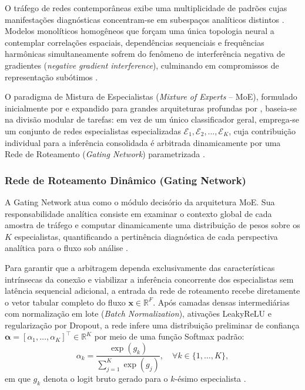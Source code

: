 O tráfego de redes contemporâneas exibe uma multiplicidade de padrões cujas manifestações diagnósticas concentram-se em subespaços analíticos distintos \cite{alfmoe2026, trafficmoe2026}. Modelos monolíticos homogêneos que forçam uma única topologia neural a contemplar correlações espaciais, dependências sequenciais e frequências harmônicas simultaneamente sofrem do fenômeno de interferência negativa de gradientes (\emph{negative gradient interference}), culminando em compromissos de representação subótimos \cite{moevd2025}.

O paradigma de Mistura de Especialistas (\emph{Mixture of Experts} -- MoE), formulado inicialmente por  e expandido para grandes arquiteturas profundas por , baseia-se na divisão modular de tarefas: em vez de um único classificador geral, emprega-se um conjunto de redes especialistas especializadas $\mathcal{E}_1, \mathcal{E}_2, \dots, \mathcal{E}_K$, cuja contribuição individual para a inferência consolidada é arbitrada dinamicamente por uma Rede de Roteamento (\emph{Gating Network}) parametrizada \cite{alfmoe2026}.

\subsubsection{Rede de Roteamento Dinâmico (Gating Network)}

A Gating Network atua como o módulo decisório da arquitetura MoE. Sua responsabilidade analítica consiste em examinar o contexto global de cada amostra de tráfego e computar dinamicamente uma distribuição de pesos sobre os $K$ especialistas, quantificando a pertinência diagnóstica de cada perspectiva analítica para o fluxo sob análise \cite{alfmoe2026}.

Para garantir que a arbitragem dependa exclusivamente das características intrínsecas da conexão e viabilizar a inferência concorrente dos especialistas sem latência sequencial adicional, a entrada da rede de roteamento recebe diretamente o vetor tabular completo do fluxo $\mathbf{x} \in \mathbb{R}^F$. Após camadas densas intermediárias com normalização em lote (\emph{Batch Normalization}), ativações LeakyReLU e regularização por Dropout, a rede infere uma distribuição preliminar de confiança $\boldsymbol{\alpha} = [\alpha_1, \dots, \alpha_K]^\top \in \mathbb{R}^K$ por meio de uma função Softmax padrão:
\begin{equation}
\label{eq:gating_preliminary_softmax}
\alpha_k = \frac{\exp(g_k)}{\sum_{j=1}^K \exp(g_j)}, \quad \forall k \in \{1, \dots, K\},
\end{equation}
em que $g_k$ denota o logit bruto gerado para o $k$-ésimo especialista \cite{alfmoe2026}.

